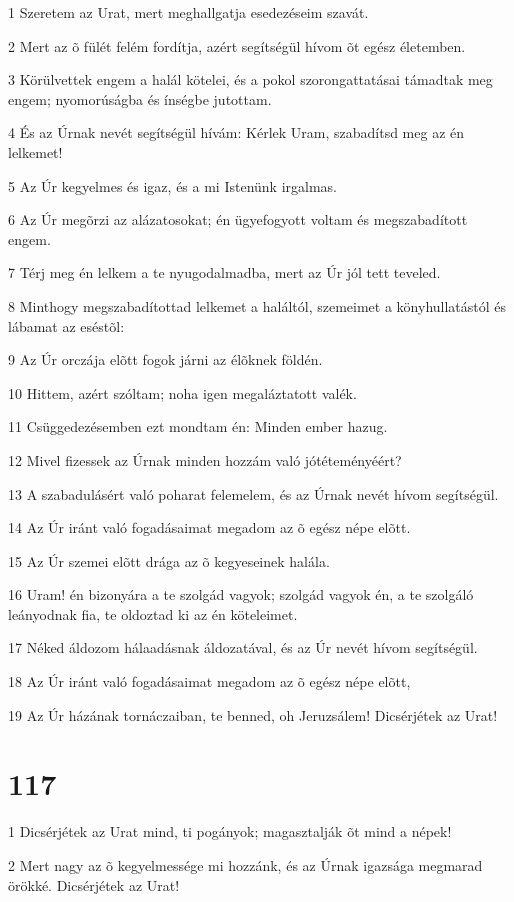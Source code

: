 \par 1 Szeretem az Urat, mert meghallgatja esedezéseim szavát.
\par 2 Mert az õ fülét felém fordítja, azért segítségül hívom õt egész életemben.
\par 3 Körülvettek engem a halál kötelei, és a pokol szorongattatásai támadtak meg engem; nyomorúságba és ínségbe jutottam.
\par 4 És az Úrnak nevét segítségül hívám: Kérlek Uram, szabadítsd meg az én lelkemet!
\par 5 Az Úr kegyelmes és igaz, és a mi Istenünk irgalmas.
\par 6 Az Úr megõrzi az alázatosokat; én ügyefogyott voltam és megszabadított engem.
\par 7 Térj meg én lelkem a te nyugodalmadba, mert az Úr jól tett teveled.
\par 8 Minthogy megszabadítottad lelkemet a haláltól, szemeimet a könyhullatástól és lábamat az eséstõl:
\par 9 Az Úr orczája elõtt fogok járni az élõknek földén.
\par 10 Hittem, azért szóltam; noha igen megaláztatott valék.
\par 11 Csüggedezésemben ezt mondtam én: Minden ember hazug.
\par 12 Mivel fizessek az Úrnak minden hozzám való jótéteményéért?
\par 13 A szabadulásért való poharat felemelem, és az Úrnak nevét hívom segítségül.
\par 14 Az Úr iránt való fogadásaimat megadom az õ egész népe elõtt.
\par 15 Az Úr szemei elõtt drága az õ kegyeseinek halála.
\par 16 Uram! én bizonyára a te szolgád vagyok; szolgád vagyok én, a te szolgáló leányodnak fia, te oldoztad ki az én köteleimet.
\par 17 Néked áldozom hálaadásnak áldozatával, és az Úr nevét hívom segítségül.
\par 18 Az Úr iránt való fogadásaimat megadom az õ egész népe elõtt,
\par 19 Az Úr házának tornáczaiban, te benned, oh Jeruzsálem! Dicsérjétek az Urat!

\chapter{117}

\par 1 Dicsérjétek az Urat mind, ti pogányok; magasztalják õt mind a népek!
\par 2 Mert nagy az õ kegyelmessége mi hozzánk, és az Úrnak igazsága megmarad örökké. Dicsérjétek az Urat!

